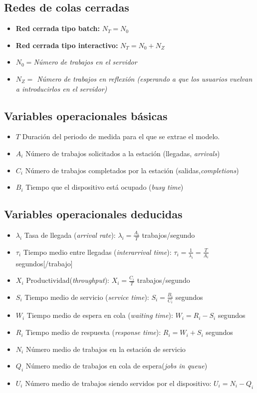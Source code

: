 \subsection{Redes de colas cerradas}
\begin{itemize}
	\item \textbf{Red cerrada tipo batch: } $N_T=N_0$
	\item \textbf{Red cerrada tipo interactivo: } $N_T=N_0+N_Z$
	\item \textit{$N_0=$Número de trabajos en el servidor}
	\item \textit{$N_Z=$ Número de trabajos en reflexión (esperando a que los usuarios vuelvan a introducirlos en el servidor)}
\end{itemize}
\subsection{Variables operacionales básicas}
\begin{itemize}
	\item \textbf{$T$} Duración del periodo de medida para el que se extrae el modelo.
	\item \textbf{$A_i$} Número de trabajos solicitados a la estación (llegadas, \textit{arrivals})
	\item \textbf{$C_i$} Número de trabajos completados por la estación (salidas,\textit{completions})
	\item \textbf{$B_i$} Tiempo que el dispositivo está ocupado (\textit{busy time})
\end{itemize}
\subsection{Variables operacionales deducidas}
\begin{itemize}
	\item \textbf{$\lambda_i$} Tasa de llegada (\textit{arrival rate}): $\lambda_i = \frac{A_i}{T} $ trabajos/segundo
	\item \textbf{$\tau_i$} Tiempo medio entre llegadas (\textit{interarrival time}): $\tau_i= \frac{1}{\lambda_i}=\frac{T}{A_i}$ segundos[/trabajo]
	\item \textbf{$X_i$} Productividad(\textit{throughput}): $X_i=\frac{C_i}{T}$ trabajos/segundo
	\item \textbf{$S_i$} Tiempo medio de servicio (\textit{service time}): $S_i=\frac{B_i}{C_i}$ segundos
	\item \textbf{$W_i$} Tiempo medio de espera en cola (\textit{waiting time}): $W_i=R_i - S_i$ segundos
	\item \textbf{$R_i$} Tiempo medio de respuesta (\textit{response time}): $R_i= W_i + S_i$ segundos
	\item \textbf{$N_i$} Número medio de trabajos en la estación de servicio
	\item \textbf{$Q_i$} Número medio de trabajos en cola de espera(\textit{jobs in queue})
	\item \textbf{$U_i$} Número medio de trabajos siendo servidos por el dispositivo: $U_i = N_i - Q_i$
\end{itemize}
